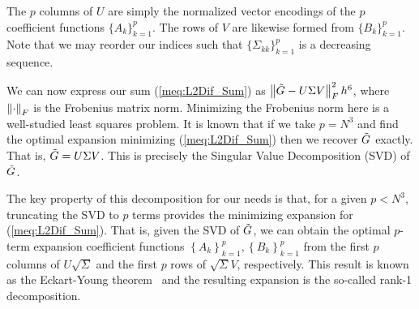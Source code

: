 The $p$ columns of $U$ are simply the normalized vector encodings of the $p$ coefficient functions $\{A_k\}_{k=1}^p$. The rows of $V$ are likewise formed from $\{B_k\}_{k=1}^p$.
Note that we may reorder our indices such that $\{\Sigma_{kk}\}_{k=1}^p$ is a decreasing sequence.

We can now express our sum (\ref{meq:L2Dif_Sum}) as $\left\lVert\tilde{G}-U\Sigma V\right\rVert_F^2h^6$, where $\left\lVert\cdot\right\rVert_F$ is the Frobenius matrix norm. Minimizing the Frobenius norm here is a well-studied least squares problem. It is known that if we take $p=N^3$ and find the optimal expansion minimizing (\ref{meq:L2Dif_Sum}) then we recover $\tilde{G}$ exactly. That is, $\tilde{G} = U\Sigma V$. This is precisely the Singular Value Decomposition (SVD) of $\tilde{G}$.

The key property of this decomposition for our needs is that, for a given $p<N^3$, truncating the SVD to $p$ terms provides the minimizing expansion for (\ref{meq:L2Dif_Sum}). That is, given the SVD of $\tilde{G}$,
we can obtain the optimal $p$-term expansion coefficient functions $\left\{A_k\right\}_{k=1}^p, \left\{B_k\right\}_{k=1}^p$ from the first $p$ columns of $U\sqrt{\Sigma}$ and the first $p$ rows of $\sqrt{\Sigma}V$, respectively. This result is known as the Eckart-Young theorem~\cite{EckartYoung} and the resulting expansion is the so-called rank-1 decomposition.


